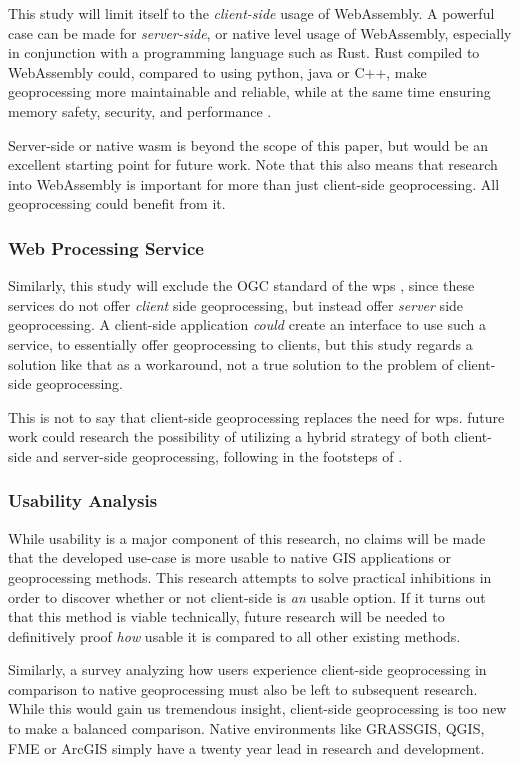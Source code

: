 This study will limit itself to the \emph{client-side} usage of WebAssembly. 
A powerful case can be made for \emph{server-side}, or native level usage of WebAssembly, especially in conjunction with a programming language such as Rust. 
Rust compiled to WebAssembly could, compared to using python, java or C++, make geoprocessing more maintainable and reliable, while at the same time ensuring memory safety, security, and performance \cite{clack_standardizing_2019}. 

Server-side or native wasm is beyond the scope of this paper, but would be an excellent starting point for future work. Note that this also means that research into WebAssembly is important for more than just client-side geoprocessing. All geoprocessing could benefit from it.



\subsubsection*{Web Processing Service} %

Similarly, this study will exclude the OGC standard of the \ac{wps} \cite{ogc_web_2015}, since these services do not offer \emph{client} side geoprocessing, but instead offer \emph{server} side geoprocessing. A client-side application \textit{could} create an interface to use such a service, to essentially offer geoprocessing to clients, but this study regards a solution like that as a workaround, not a true solution to the problem of client-side geoprocessing. 

This is not to say that client-side geoprocessing replaces the need for \ac{wps}. 
future work could research the possibility of utilizing a hybrid strategy of both client-side and server-side geoprocessing, following in the footsteps of \cite{panidi_hybrid_2015}. 


\subsubsection*{Usability Analysis} %

While usability is a major component of this research, no claims will be made that the developed use-case is more usable to native GIS applications or geoprocessing methods. This research attempts to solve practical inhibitions in order to discover whether or not client-side is \emph{an} usable option. If it turns out that this method is viable technically, future research will be needed to definitively proof \emph{how} usable it is compared to all other existing methods.  


Similarly, a survey analyzing how users experience client-side geoprocessing in comparison to native geoprocessing must also be left to subsequent research. While this would gain us tremendous insight, client-side geoprocessing is too new to make a balanced comparison. Native environments like GRASSGIS, QGIS, FME or ArcGIS simply have a twenty year lead in research and development. 
